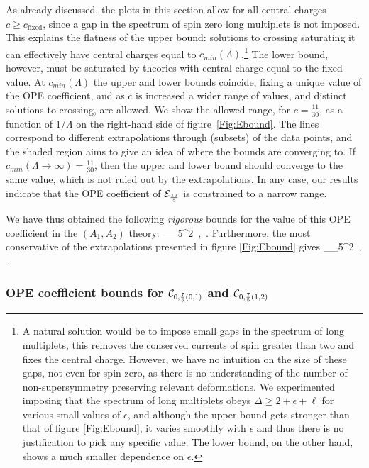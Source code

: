 As already discussed, the plots in this section allow for all central charges $c\geqslant c_{\mathrm{fixed}}$, since a gap in the spectrum of spin zero long multiplets is not imposed. This explains the flatness of the upper bound: solutions to crossing saturating it can effectively have central charges equal to $c_{min}(\Lambda)$.\footnote{A natural solution would be to impose small gaps in the spectrum of long multiplets, this removes the conserved currents of spin greater than two and fixes the central charge. However, we have no intuition on the size of these gaps, not even for spin zero, as there is no understanding of the number of non-supersymmetry preserving relevant deformations. We 
experimented imposing that the spectrum of long multiplets obeys $\Delta \geqslant 2+\epsilon + \ell$ for various small values of $\epsilon$, and although the upper bound gets stronger than that of figure \ref{Fig:Ebound}, it varies smoothly with $\epsilon$ and thus there is no justification to pick any specific value. The lower bound, on the other hand, shows a much smaller dependence on $\epsilon$.} 
The lower bound, however, must be saturated by theories with central charge equal to the fixed value.
At $c_{min}(\Lambda)$ the upper and lower bounds coincide, fixing a unique value of the OPE coefficient, and as $c$ is increased a wider range of values, and distinct solutions to crossing, are allowed. We show the allowed range, for $c=\tfrac{11}{30}$, as a function of $1/\Lambda$ on the right-hand side of figure~\ref{Fig:Ebound}. The lines correspond to different extrapolations through (subsets) of the data points, and the shaded region aims to give an idea of where the bounds are converging to. If $c_{min}(\Lambda \to \infty) = \tfrac{11}{30}$, then the upper and lower bound should converge to the same value, which is not ruled out by the extrapolations. In any case, our results indicate that the OPE coefficient of ${\mathcal{E}}_{\frac{12}5}$ is constrained to a narrow range.


We have thus obtained the following 
\emph{rigorous} bounds for the value of this OPE coefficient in the $(A_1,A_2)$ theory:
 \leqslant \lambda_{\EE_{5}}^2  \,, \qquad {}\; \,.
\label{eq:Ebound}
\ee
Furthermore, the most conservative of the extrapolations presented in figure \ref{Fig:Ebound} gives
 \lesssim \lambda_{\EE_{5}}^2  \,, \qquad {}\; \Lambda\to \infty\,.
\label{eq:Eboundextrapol}
\ee


\subsubsection*{OPE coefficient bounds for ${\mathcal{C}}_{0,\frac75(0,1)}$  and ${\mathcal{C}}_{0,\frac75(1,2)}$}

